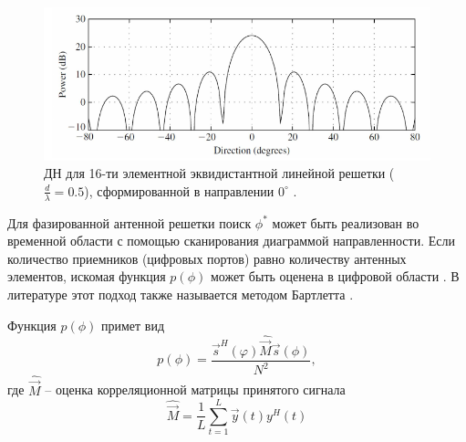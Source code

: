 \begin{figure}
    \centering
    \includegraphics[width=\linewidth]{figs/fig3.9}
    \caption{ДН для 16-ти элементной эквидистантной линейной
        решетки ($\frac{d}{\lambda}=0.5$), сформированной в направлении $0^\circ$
        \cite{Tuncer2009}. }
    \label{fig:3.9}
\end{figure}

Для фазированной антенной решетки поиск $\phi^*$ может быть реализован во временной
области с помощью сканирования диаграммой направленности. Если количество
приемников (цифровых портов) равно количеству антенных элементов, искомая
функция $p(\phi)$ может быть оценена в цифровой области \cite{Stoica2005}.  В
литературе этот подход также называется методом Бартлетта \cite{Godara2004}.

Функция $p(\phi)$ примет вид
\begin{equation}
    p(\phi) = \frac{\vec s^H(\varphi) \hat{\vec M} \vec s (\phi)}{N^2},
\end{equation}
где $\hat{\vec M}$ -- оценка корреляционной матрицы принятого сигнала
\begin{equation}
    \hat{\vec M} = \frac{1}{L} \sum\limits_{t=1}^{L} \vec y(t) y^H (t)
\end{equation}

